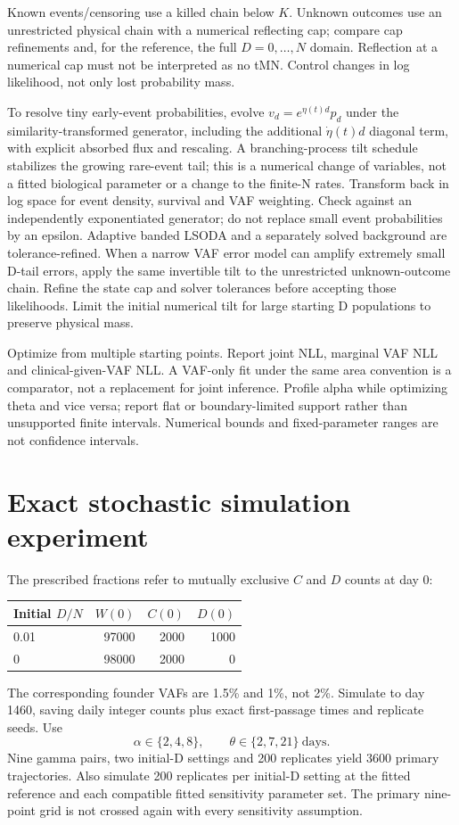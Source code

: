 \documentclass[11pt]{article}
\begin{document}
Known events/censoring use a killed chain below $K$. Unknown outcomes use an unrestricted physical chain with a numerical reflecting cap; compare cap refinements and, for the reference, the full $D=0,\ldots,N$ domain. Reflection at a numerical cap must not be interpreted as no tMN. Control changes in log likelihood, not only lost probability mass.

To resolve tiny early-event probabilities, evolve $v_d=e^{\eta(t)d}p_d$ under the similarity-transformed generator, including the additional $\dot\eta(t)d$ diagonal term, with explicit absorbed flux and rescaling. A branching-process tilt schedule stabilizes the growing rare-event tail; this is a numerical change of variables, not a fitted biological parameter or a change to the finite-N rates. Transform back in log space for event density, survival and VAF weighting. Check against an independently exponentiated generator; do not replace small event probabilities by an epsilon. Adaptive banded LSODA and a separately solved background are tolerance-refined.
When a narrow VAF error model can amplify extremely small D-tail errors, apply the same invertible tilt to the unrestricted unknown-outcome chain. Refine the state cap and solver tolerances before accepting those likelihoods. Limit the initial numerical tilt for large starting D populations to preserve physical mass.

Optimize from multiple starting points. Report joint NLL, marginal VAF NLL and clinical-given-VAF NLL. A VAF-only fit under the same area convention is a comparator, not a replacement for joint inference. Profile alpha while optimizing theta and vice versa; report flat or boundary-limited support rather than unsupported finite intervals. Numerical bounds and fixed-parameter ranges are not confidence intervals.

\section{Exact stochastic simulation experiment}
The prescribed fractions refer to mutually exclusive $C$ and $D$ counts at day 0:
\begin{center}\begin{tabular}{lrrr}\toprule Initial $D/N$ & $W(0)$ & $C(0)$ & $D(0)$\\\midrule
0.01 & 97000 & 2000 & 1000\\
0 & 98000 & 2000 & 0\\\bottomrule\end{tabular}\end{center}
The corresponding founder VAFs are 1.5\% and 1\%, not 2\%. Simulate to day 1460, saving daily integer counts plus exact first-passage times and replicate seeds. Use
\[
\alpha\in\{2,4,8\},\qquad\theta\in\{2,7,21\}\ \mathrm{days}.
\]
Nine gamma pairs, two initial-D settings and 200 replicates yield 3600 primary trajectories. Also simulate 200 replicates per initial-D setting at the fitted reference and each compatible fitted sensitivity parameter set. The primary nine-point grid is not crossed again with every sensitivity assumption.
\end{document}
